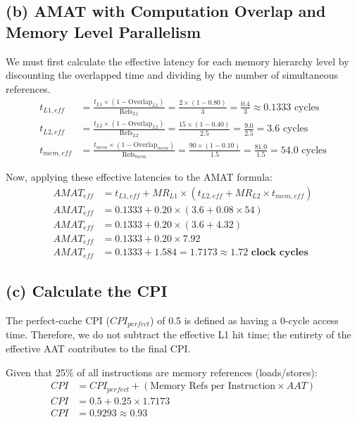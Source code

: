 \documentclass{article}
\begin{document}
\subsection{(b) AMAT with Computation Overlap and Memory Level Parallelism}
We must first calculate the effective latency for each memory hierarchy level by discounting the overlapped time and dividing by the number of simultaneous references.
\begin{align*}
	t_{L1,eff}  & = \frac{t_{L1} \times (1 - \text{Overlap}_{L1})}{\text{Refs}_{L1}} = \frac{2 \times (1 - 0.80)}{3} = \frac{0.4}{3} \approx 0.1333 \text{ cycles}  \\[10pt]
	t_{L2,eff}  & = \frac{t_{L2} \times (1 - \text{Overlap}_{L2})}{\text{Refs}_{L2}} = \frac{15 \times (1 - 0.40)}{2.5} = \frac{9.0}{2.5} = 3.6 \text{ cycles}      \\[10pt]
	t_{mem,eff} & = \frac{t_{mem} \times (1 - \text{Overlap}_{mem})}{\text{Refs}_{mem}} = \frac{90 \times (1 - 0.10)}{1.5} = \frac{81.0}{1.5} = 54.0 \text{ cycles}
\end{align*}

Now, applying these effective latencies to the AMAT formula:
\begin{align*}
	AMAT_{eff} & = t_{L1,eff} + MR_{L1} \times (t_{L2,eff} + MR_{L2} \times t_{mem,eff}) \\
	AMAT_{eff} & = 0.1333 + 0.20 \times (3.6 + 0.08 \times 54)                           \\
	AMAT_{eff} & = 0.1333 + 0.20 \times (3.6 + 4.32)                                     \\
	AMAT_{eff} & = 0.1333 + 0.20 \times 7.92                                             \\
	AMAT_{eff} & = 0.1333 + 1.584 = 1.7173 \approx \mathbf{1.72 \text{ clock cycles}}
\end{align*}

\subsection{(c) Calculate the CPI}
The perfect-cache CPI ($CPI_{perfect}$) of 0.5 is defined as having a 0-cycle access time. Therefore, we do not subtract the effective L1 hit time; the entirety of the effective AAT contributes to the final CPI.

Given that 25\% of all instructions are memory references (loads/stores):
\begin{align*}
	CPI & = CPI_{perfect} + (\text{Memory Refs per Instruction} \times AAT) \\
	CPI & = 0.5 + 0.25 \times 1.7173                                               \\
	CPI & = 0.9293 \approx \mathbf{0.93}
\end{align*}
\end{document}

